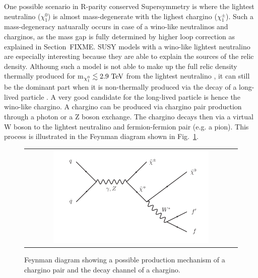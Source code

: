 One possible scenario in R-parity conserved Supersymmetry is where the lightest neutralino ($\chi^{0}_1$) is almost mass-degenerate with the lighest chargino ($\chi^{\pm}_1$).
Such a mass-degeneracy natuarally occurs in case of a wino-like neutralinos and charginos, as the mass gap is fully determined by higher loop correction as explained in Section~FIXME.
SUSY models with a wino-like lightest neutralino are especially interesting because they are able to explain the sources of the relic density.
Althoung such a model is not able to make up the full relic density thermally produced for m$_{\chi^{0}_1}\lesssim 2.9\,\,\text{Te}\kern-0.06667em\text{V}$ from the lightest neutralino \cite{bib:Ibe:DarkMatter_2015}, 
it can still be the dominant part when it is non-thermally produced via the decay of a long-lived particle \cite{bib:Moroi:DarkMatter_2013}.
A very good candidate for the long-lived particle is hence the wino-like chargino.
A chargino can be produced via chargino pair production through a photon or a Z boson exchange. The chargino decays then via a virtual W boson to the lightest neutralino and fermion-fermion pair (e.g. a pion).
This process is illustrated in the Feynman diagram shown in Fig.~\ref{fig:FeynmanDiagram}.
\begin{figure}[!b]
  \centering 
  \begin{tabular}{c}
    \includegraphics[width=0.75\textwidth]{figures/analysis/ChiChi_ProductionAndDecay.pdf}
  \end{tabular}
  \caption{Feynman diagram showing a possible production mechanism of a chargino pair and the decay channel of a chargino.}
  \label{fig:FeynmanDiagram}
\end{figure}

